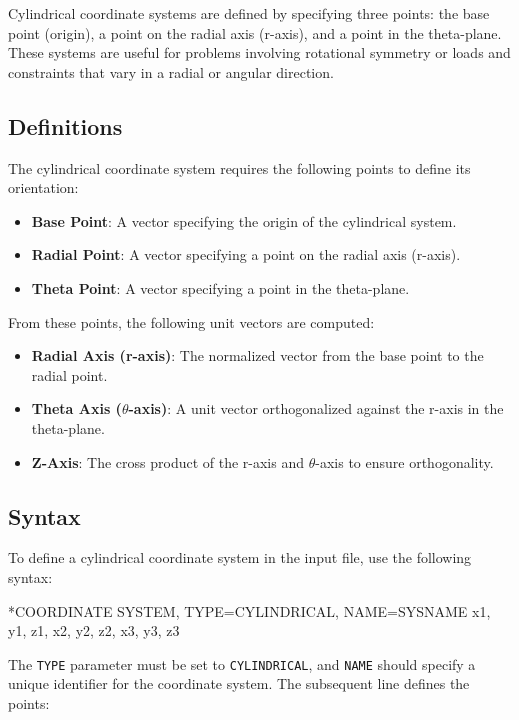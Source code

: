 Cylindrical coordinate systems are defined by specifying three points: the base point (origin), a point on the radial axis (r-axis), and a point in the theta-plane. These systems are useful for problems involving rotational symmetry or loads and constraints that vary in a radial or angular direction.


\subsection{Definitions}


The cylindrical coordinate system requires the following points to define its orientation:


\begin{itemize}
\item \textbf{Base Point}: A vector specifying the origin of the cylindrical system.
\item \textbf{Radial Point}: A vector specifying a point on the radial axis (r-axis).
\item \textbf{Theta Point}: A vector specifying a point in the theta-plane.
\end{itemize}


From these points, the following unit vectors are computed:


\begin{itemize}
\item \textbf{Radial Axis (r-axis)}: The normalized vector from the base point to the radial point.
\item \textbf{Theta Axis ($\theta$-axis)}: A unit vector orthogonalized against the r-axis in the theta-plane.
\item \textbf{Z-Axis}: The cross product of the r-axis and $\theta$-axis to ensure orthogonality.
\end{itemize}


\subsection{Syntax}


To define a cylindrical coordinate system in the input file, use the following syntax:


\begin{codeBlock}
*COORDINATE SYSTEM, TYPE=CYLINDRICAL, NAME=SYSNAME
x1, y1, z1, x2, y2, z2, x3, y3, z3
\end{codeBlock}


The \texttt{TYPE} parameter must be set to \texttt{CYLINDRICAL}, and \texttt{NAME} should specify a unique identifier for the coordinate system. The subsequent line defines the points:


